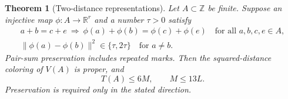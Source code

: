 \documentclass[11pt,a4paper]{article}
\newtheorem{theorem}{Theorem}[section]
\theoremstyle{definition}
\newcommand{\Z}{\mathbb Z}
\newcommand{\R}{\mathbb R}
\numberwithin{equation}{section}
\begin{document}
\begin{theorem}[Two-distance representations]\label{thm:two_distance}
Let $A\subset\Z$ be finite. Suppose an injective map $\phi:A\to\R^r$ and a number $\tau>0$ satisfy
\begin{equation}\label{eq:two-distance-hypotheses}
\begin{gathered}
a+b=c+e\ \Longrightarrow\ \phi(a)+\phi(b)=\phi(c)+\phi(e)
\quad\text{for all }a,b,c,e\in A,\\
\|\phi(a)-\phi(b)\|^2\in\{\tau,2\tau\}\quad\text{for }a\ne b.
\end{gathered}
\end{equation}
Pair-sum preservation includes repeated marks. Then the squared-distance coloring of $V(A)$ is proper, and
\begin{equation}\label{eq:two-distance-bounds}
T(A)\le6M,\qquad M\le13L.
\end{equation}
Preservation is required only in the stated direction.
\end{theorem}
\end{document}
